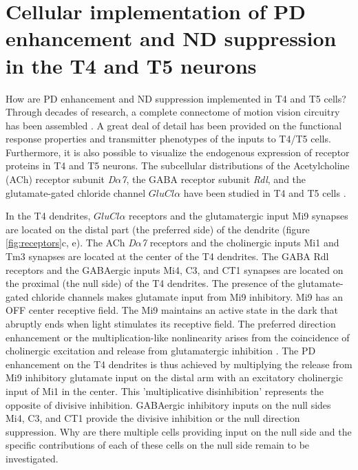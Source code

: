 \section{Cellular implementation of PD enhancement and ND suppression in the T4 and T5 neurons}
How are PD enhancement and ND suppression implemented in T4 and T5 cells?  Through decades of research, a complete connectome of motion vision circuitry has been assembled \parencite{Takemura2008, Takemura2017, Shinomiya2014, Shinomiya2019}. A great deal of detail has been provided on the functional response properties \parencite{Arenz2017, Drews2020, Strother2017, Serbe2016} and transmitter phenotypes \parencite{Davis2020, Shinomiya2019, Takemura2017} of the inputs to T4/T5 cells. Furthermore, it is also possible to visualize the endogenous expression of receptor proteins in T4 and T5 neurons. The subcellular distributions of the Acetylcholine (ACh) receptor subunit \textit{D$\alpha$7}, the GABA receptor subunit \textit{Rdl}, and the glutamate-gated chloride channel \textit{$GluCl\alpha$} have been studied in T4 and T5 cells \parencite{Fendl2020}.

In the T4 dendrites, \textit{$GluCl\alpha$} receptors and the glutamatergic input Mi9 synapses are located on the distal part (the preferred side) of the dendrite (figure \ref{fig:receptors}c, e). The ACh \textit{D$\alpha$7} receptors and the cholinergic inputs Mi1 and Tm3 synapses are located at the center of the T4 dendrites. The GABA Rdl receptors and the GABAergic inputs Mi4, C3, and CT1 synapses are located on the proximal (the null side) of the T4 dendrites. The presence of the glutamate-gated chloride channels makes glutamate input from Mi9 inhibitory. Mi9 has an OFF center receptive field. The Mi9 maintains an active state in the dark that abruptly ends when light stimulates its receptive field. The preferred direction enhancement or the multiplication-like nonlinearity arises from the coincidence of cholinergic excitation and release from glutamatergic inhibition \parencite{Groschner2022}. The PD enhancement on the T4 dendrites is thus achieved by multiplying the release from Mi9 inhibitory glutamate input on the distal arm with an excitatory cholinergic input of Mi1 in the center. This 'multiplicative disinhibition' represents the opposite of divisive inhibition. GABAergic inhibitory inputs on the null sides Mi4, C3, and CT1 provide the divisive inhibition or the null direction suppression. Why are there multiple cells providing input on the null side and the specific contributions of each of these cells on the null side remain to be investigated.

